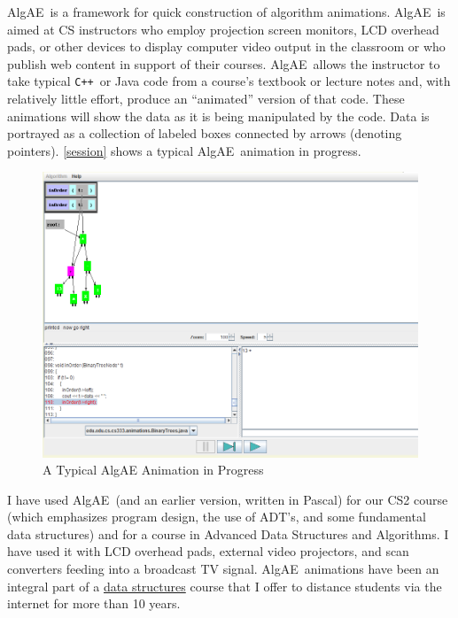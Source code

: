 \documentclass[11pt,titlepage]{book}
\newcommand{\algae}{{\sc AlgAE}}
\newcommand{\cpp}{{\tt C++}}
\begin{document}
\algae\ is a framework for quick construction of algorithm
animations. \algae\ is aimed at CS instructors who
employ projection screen monitors, LCD overhead pads,
or other devices to display computer video
output in the classroom or who publish web content in support of their courses.
\algae\ allows the instructor to take
typical \cpp\ or Java code from a course's textbook or lecture notes and, with
relatively little effort, produce an ``animated'' version of that
code. These animations will show the data as it is being manipulated by
the code. Data is portrayed as a collection of labeled boxes
connected by arrows (denoting pointers). \autoref{session} shows a
typical \algae\ animation in progress.
\begin{figure}
\centering
\includegraphics[width=\textwidth]{images/screenshot}
\caption{A Typical AlgAE Animation in Progress}
\label{session}
\end{figure}

I have used \algae\ (and an earlier version, written in
Pascal)  for our CS2 course (which emphasizes program design, the use
of ADT's, and some fundamental data structures) and  for a course in
Advanced Data Structures and 
Algorithms.  I have used it with LCD overhead pads, external video
projectors, and scan converters feeding into a broadcast TV signal.
 \algae\ animations have been an integral part of a
\href{http://www.cs.odu.edu/~fac/teched.html}{data structures}
course that I offer to distance students via the internet for more 
than 10 years.
\end{document}
